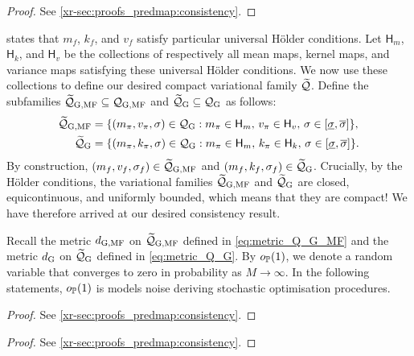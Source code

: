 \documentclass[12pt, twoside]{report}
\newcommand{\xrprefix}[1]{xr-#1}
\begin{document}
\begin{proof}
    See \cref{\xrprefix{sec:proofs_predmap:consistency}}.
\end{proof}

 states that $m_f$, $k_f$, and $v_f$ satisfy particular universal H\"older conditions.
Let $\mathsf{H}_m$, $\mathsf{H}_k$, and $\mathsf{H}_v$ be the collections of respectively all mean maps, kernel maps, and variance maps satisfying these universal H\"older conditions.
We now use these collections to define our desired compact variational family $\widetilde{\Qc}$.
Define the subfamilies $\widetilde\Qc\ss{G,MF} \sub \Qc\ss{G,MF}$ and $\widetilde\Qc\ss{G} \sub \Qc\ss{G}$ as follows:
\begin{align}
    \widetilde\Qc\ss{G,MF} &= \set*{
        (m_\pi, v_\pi, \sigma) \in \Qc\ss{G} :
            m_\pi \in \mathsf{H}_m,\,
            v_\pi \in \mathsf{H}_v,\,
            \sigma \in [\underline{\sigma}, \overline{\sigma}]
    }, \\
    \widetilde\Qc\ss{G} &= \set*{
        (m_\pi, k_\pi, \sigma) \in \Qc\ss{G} :
            m_\pi \in \mathsf{H}_m,\,
            k_\pi \in \mathsf{H}_k,\,
            \sigma \in [\underline{\sigma}, \overline{\sigma}]
    }.
\end{align}
By construction, $(m_f, v_f, \sigma_f) \in \widetilde\Qc\ss{G,MF}$ and $(m_f, k_f, \sigma_f) \in \widetilde\Qc\ss{G}$.
Crucially, by the H\"older conditions, the variational families $\widetilde\Qc\ss{G,MF}$ and $\widetilde\Qc\ss{G}$ are closed, equicontinuous, and uniformly bounded, which means that they are compact!
We have therefore arrived at our desired consistency result.

Recall the metric $d\ss{G,MF}$ on $\widetilde\Qc\ss{G,MF}$ defined in \eqref{eq:metric_Q_G_MF}
and the metric $d\ss{G}$ on $\widetilde\Qc\ss{G}$ defined in \eqref{eq:metric_Q_G}.
By $o_\P(1)$, we denote a random variable that converges to zero in probability as $M \to \infty$.
In the following statements, $o_\P(1)$ is models noise deriving stochastic optimisation procedures.

\begin{proof}
    See \cref{\xrprefix{sec:proofs_predmap:consistency}}.
\end{proof}

\begin{proof}
    See \cref{\xrprefix{sec:proofs_predmap:consistency}}.
\end{proof}
\end{document}
